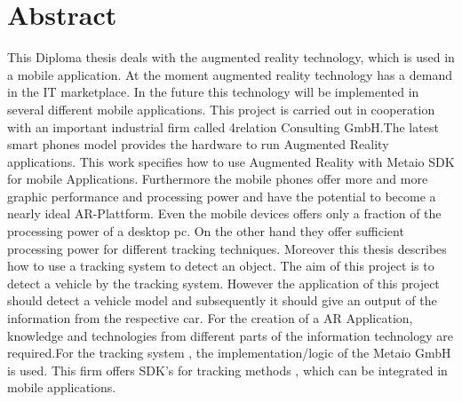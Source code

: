 \chapter*{Abstract}

This Diploma thesis deals with the augmented reality technology, which is used in a mobile application. At the moment augmented reality technology has a demand in the IT marketplace. In the future this technology will be implemented in several different mobile applications. This project is carried out in cooperation with an important industrial firm called 4relation Consulting GmbH.The latest smart phones model provides the hardware to run Augmented Reality applications. This work specifies how to use Augmented Reality with Metaio SDK for mobile Applications. Furthermore the mobile phones offer more and more graphic performance and processing power and have the potential to become a nearly ideal AR-Plattform. Even the mobile devices offers only a fraction of the processing power of a desktop pc. On the other hand they offer sufficient processing power for different tracking techniques. Moreover this thesis describes how to use a tracking system to detect an object. The aim of this project is to detect a vehicle by the tracking system. However the application of this project should detect a vehicle model and subsequently it should give an output of the information from the respective car. For the creation of a AR Application, knowledge and technologies from different parts of the information technology are required.For the tracking system , the implementation/logic of the Metaio GmbH is used. This firm offers SDK's for tracking methods , which can be integrated in mobile applications.